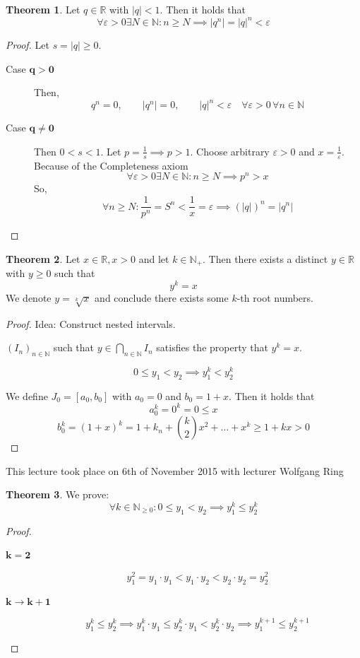 \documentclass[a4paper,landscape,twocolumn]{article}
\theoremstyle{definition}
\newtheorem{theorem}{Theorem}
\newcommand\abs[1]{\left|#1\right|}
\newcommand\meta[3]{\begin{mdframed}[skipbelow=4pt,skipabove=4pt,innermargin=1pt,innerleftmargin=1pt,innerrightmargin=1pt]\begin{center}\small{\textdownarrow{} This #1 took place on #2 with lecturer #3}\end{center}\end{mdframed}}
\begin{document}
\begin{theorem}
  Let $q \in \mathbb R$ with $\abs{q} < 1$. Then it holds that
  \[
    \forall \varepsilon > 0 \exists N \in \mathbb N:
    n \geq N \implies \abs{q^n} = \abs{q}^n < \varepsilon
  \]
\end{theorem}

\begin{proof}
  Let $s = \abs{q} \geq 0$.
  \begin{description}
    \item[Case $\mathbf{q > 0}$] Then,
      \[ q^n = 0,   \qquad   \abs{q^n} = 0,   \qquad    \abs{q}^n < \varepsilon \quad \forall \varepsilon > 0\, \forall n \in \mathbb N \]
    \item[Case $\mathbf{q \neq 0}$] Then $0 < s < 1$. Let $p = \frac1s \implies p > 1$.
      Choose arbitrary $\varepsilon > 0$ and $x = \frac1\varepsilon$.
      Because of the Completeness axiom
      \[ \forall \varepsilon > 0 \exists N \in \mathbb N: n \geq N \implies p^n > x \]
      So,
      \[ \forall n \geq N: \frac1{p^n} = S^n < \frac1x = \varepsilon  \implies \left(\abs{q}\right)^n = \abs{q^n} \]
  \end{description}
\end{proof}

\begin{theorem}
  Let $x \in \mathbb R, x > 0$ and let $k \in \mathbb N_+$.
  Then there exists a distinct $y \in \mathbb R$ with $y \geq 0$
  such that
  \[ y^k = x \]
  We denote $y = \sqrt[k]{x}$ and conclude there exists some $k$-th root numbers.
\end{theorem}

\begin{proof}
  Idea: Construct nested intervals.

  $(I_n)_{n \in \mathbb N}$ such that $y \in \bigcap_{n \in \mathbb N} I_n$
  satisfies the property that $y^k = x$.

  \[ 0 \leq y_1 < y_2 \implies y_1^k < y_2^k \]

  We define $J_0 = [a_0, b_0]$ with $a_0 = 0$ and $b_0 = 1 + x$.
  Then it holds that
  \[ a_0^k = 0^k = 0 \leq x \]
  \[ b_0^k = (1 + x)^k = 1 + k_n + \binom{k}{2} x^2 + \dots + x^k \geq 1 + kx > 0 \]
\end{proof}

\meta{lecture}{6th of November 2015}{Wolfgang Ring}

\begin{theorem}
  We prove:
  \[ \forall k \in \mathbb N_{\geq 0}: 0 \leq y_1 < y_2 \implies y_1^k \leq y_2^k \]
\end{theorem}
\begin{proof}
  \begin{description}
    \item[$\mathbf{k = 2}$]
      \[ y_1^2 = y_1 \cdot y_1 < y_1 \cdot y_2 < y_2 \cdot y_2 = y_2^2 \]
    \item[$\mathbf{k \to k + 1}$]
      \[
        y_1^k \leq y_2^k
        \implies y_1^k \cdot y_1 \leq y_2^k \cdot y_1 < y_2^k \cdot y_2
        \implies y_1^{k+1} \leq y_2^{k+1}
      \]
  \end{description}
\end{proof}
\end{document}

